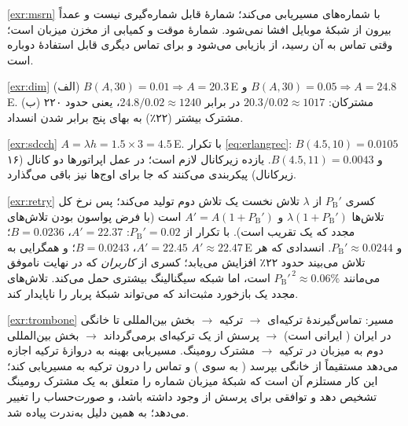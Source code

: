 \documentclass[11pt,a4paper]{article}
\begin{document}
\begin{solutionbox}{\ref{exr:msrn}}
 با شماره‌های  مسیریابی می‌کند؛  شمارهٔ قابل شماره‌گیری نیست و
عمداً بیرون از شبکهٔ موبایل افشا نمی‌شود.  شمارهٔ موقت و کمیابی از مخزن 
میزبان است؛ وقتی تماس به آن  رسید،  از  بازیابی می‌شود و 
برای تماس دیگری قابل استفادهٔ دوباره است.
\end{solutionbox}

\begin{solutionbox}{\ref{exr:dim}}
(الف) $B(A,30)=0.01 \Rightarrow A = 20.3$\,E و $B(A,30)=0.05 \Rightarrow A = 24.8$\,E.
(ب) مشترکان: $20.3/0.02 \approx 1017$ در برابر $24.8/0.02 \approx 1240$، یعنی حدود ۲۲۰ مشترک
بیشتر (۲۲٪) به بهای پنج برابر شدن انسداد.
\end{solutionbox}

\begin{solutionbox}{\ref{exr:sdcch}}
$A = \lambda h = 1.5\times3 = 4.5$\,E. با تکرار \cref{eq:erlangrec}: $B(4.5,10)=0.0105$ و
$B(4.5,11)=0.0043$. یازده زیرکانال لازم است؛ در عمل اپراتورها دو کانال  (۱۶ زیرکانال)
پیکربندی می‌کنند که جا برای اوج‌ها نیز باقی می‌گذارد.
\end{solutionbox}

\begin{solutionbox}{\ref{exr:retry}}
کسری $P_{\mathrm{B}}'$ از $\lambda$ تلاش نخست یک تلاش دوم تولید می‌کند؛ پس نرخ کل تلاش‌ها
$\lambda(1+P_{\mathrm{B}}')$ و $A' = A(1+P_{\mathrm{B}}')$ است (با فرض پواسون بودن تلاش‌های مجدد که
یک تقریب است). با تکرار از $P_{\mathrm{B}}'=0.02$:
$A' = 22.37$، $B = 0.0236$؛ $A' = 22.45$، $B = 0.0243$؛ و همگرایی به
$A' \approx 22.47$\,E و $P_{\mathrm{B}}' \approx 0.0244$. انسدادی که هر تلاش می‌بیند حدود ۲۲٪
افزایش می‌یابد؛ کسری از \emph{کاربران} که در نهایت ناموفق می‌مانند
$P_{\mathrm{B}}'^{\,2}\approx 0.06\%$ است، اما شبکه سیگنالینگ بیشتری حمل می‌کند. تلاش‌های مجدد یک
بازخورد مثبت‌اند که می‌تواند شبکهٔ پربار را ناپایدار کند.
\end{solutionbox}

\begin{solutionbox}{\ref{exr:trombone}}
مسیر: تماس‌گیرندهٔ ترکیه‌ای $\to$  ترکیه $\to$ بخش بین‌المللی تا  خانگی در
ایران ( ایرانی است) $\to$ پرسش از  یک  ترکیه‌ای برمی‌گرداند $\to$
بخش بین‌المللی دوم به  میزبان در ترکیه $\to$ مشترک رومینگ. مسیریابی بهینه به دروازهٔ
ترکیه اجازه می‌دهد مستقیماً از  خانگی بپرسد (  به سوی )
و تماس را درون ترکیه به  مسیریابی کند؛ این کار مستلزم آن است که شبکهٔ میزبان شماره را
متعلق به یک مشترک رومینگ تشخیص دهد و توافقی برای پرسش از  وجود داشته باشد، و صورت‌حساب
را تغییر می‌دهد؛ به همین دلیل به‌ندرت پیاده شد.
\end{solutionbox}
\end{document}
